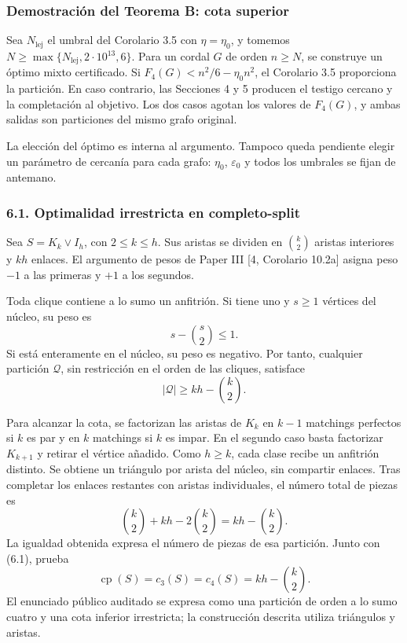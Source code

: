 \documentclass[spanish,11pt,a4paper]{article}
\begin{document}
\subsubsection{Demostración del Teorema B: cota superior}\label{demostraciuxf3n-del-teorema-b-cota-superior}

Sea \(N_{\mathrm{lej}}\) el umbral del Corolario 3.5 con \(\eta=\eta_0\), y tomemos \(N\ge\max\{N_{\mathrm{lej}},2\cdot10^{13},6\}\). Para un cordal \(G\) de orden \(n\ge N\), se construye un óptimo mixto certificado. Si \(F_4(G)<n^2/6-\eta_0n^2\), el Corolario 3.5 proporciona la partición. En caso contrario, las Secciones 4 y 5 producen el testigo cercano y la completación al objetivo. Los dos casos agotan los valores de \(F_4(G)\), y ambas salidas son particiones del mismo grafo original.

La elección del óptimo es interna al argumento. Tampoco queda pendiente elegir un parámetro de cercanía para cada grafo: \(\eta_0\), \(\varepsilon_0\) y todos los umbrales se fijan de antemano.

\subsubsection{6.1. Optimalidad irrestricta en completo-split}\label{optimalidad-irrestricta-en-completo-split}

Sea \(S=K_k\vee I_h\), con \(2\le k\le h\). Sus aristas se dividen en \(\binom k2\) aristas interiores y \(kh\) enlaces. El argumento de pesos de Paper III {[}4, Corolario 10.2a{]} asigna peso \(-1\) a las primeras y \(+1\) a los segundos.

Toda clique contiene a lo sumo un anfitrión. Si tiene uno y \(s\ge1\) vértices del núcleo, su peso es \[
s-\binom s2\le1.
\] Si está enteramente en el núcleo, su peso es negativo. Por tanto, cualquier partición \(\mathcal Q\), sin restricción en el orden de las cliques, satisface \[
|\mathcal Q|\ge kh-\binom k2.
\tag{6.1}
\]

Para alcanzar la cota, se factorizan las aristas de \(K_k\) en \(k-1\) matchings perfectos si \(k\) es par y en \(k\) matchings si \(k\) es impar. En el segundo caso basta factorizar \(K_{k+1}\) y retirar el vértice añadido. Como \(h\ge k\), cada clase recibe un anfitrión distinto. Se obtiene un triángulo por arista del núcleo, sin compartir enlaces. Tras completar los enlaces restantes con aristas individuales, el número total de piezas es \[
\binom k2+kh-2\binom k2=kh-\binom k2.
\] La igualdad obtenida expresa el número de piezas de esa partición. Junto con (6.1), prueba \[
\operatorname{cp}(S)=c_3(S)=c_4(S)=kh-\binom k2.
\tag{6.2}
\] El enunciado público auditado se expresa como una partición de orden a lo sumo cuatro y una cota inferior irrestricta; la construcción descrita utiliza triángulos y aristas.
\end{document}
